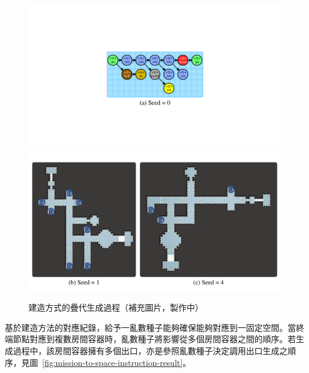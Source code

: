 \begin{figure}[!htb]
  \begin{center}
    \includegraphics[width=1.0\textwidth]{figures/mission-to-space-instruction-result.pdf}
    \includegraphics[width=1.0\textwidth]{figures/mission-to-space-instruction-result-.pdf}
    \caption{建造方式的疊代生成過程（補充圖片，製作中）} 
    \label{fig:mission-to-space-instruction-flow}
  \end{center}
\end{figure}

基於建造方法的對應紀錄，給予一亂數種子能夠確保能夠對應到一固定空間。當終端節點對應到複數房間容器時，亂數種子將影響從多個房間容器之間的順序。若生成過程中，該房間容器擁有多個出口，亦是參照亂數種子決定調用出口生成之順序，見圖~\ref{fig:mission-to-space-instruction-result}。

